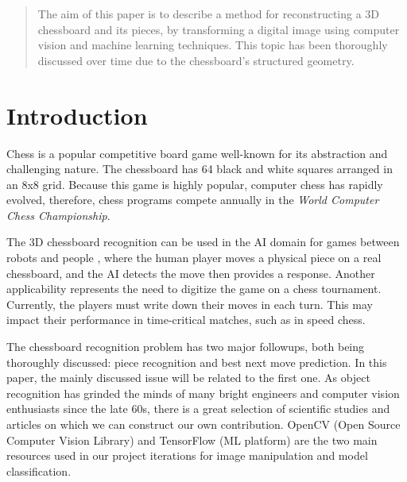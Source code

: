 \documentclass[conference]{IEEEtran}
\begin{document}
\maketitle

\begin{abstract}
The aim of this paper is to describe a method for reconstructing a 3D chessboard and its pieces, by transforming a digital image using computer vision and machine learning techniques. This topic has been thoroughly discussed over time due to the chessboard's structured geometry. 
\end{abstract}

\IEEEpeerreviewmaketitle



\section{Introduction}
Chess is a popular competitive board game well-known for its abstraction and challenging nature. The chessboard has 64 black and white squares arranged in an 8x8 grid. Because this game is highly popular, computer chess has rapidly evolved, therefore, chess programs compete annually in the \emph{World Computer Chess Championship}. 

The 3D chessboard recognition can be used in the AI domain for games between robots and people \cite{czyzewski20}, where the human player moves a physical piece on a real chessboard, and the AI detects the move then provides a response. Another applicability represents the need to digitize the game on a chess tournament. Currently, the players must write down their moves in each turn. This may impact their performance in time-critical matches, such as in speed chess.

The chessboard recognition problem has two major followups, both being thoroughly discussed: piece recognition and best next move prediction. In this paper, the mainly discussed issue will be related to the first one. As object recognition has grinded the minds of many bright engineers and computer vision enthusiasts since the late 60s, there is a great selection of scientific studies and articles on which we can construct our own contribution. OpenCV \cite{opencv_library} (Open Source Computer Vision Library) and TensorFlow \cite{tensorflow2015-whitepaper} (ML platform) are the two main resources used in our project iterations for image manipulation and model classification. 
\end{document}
